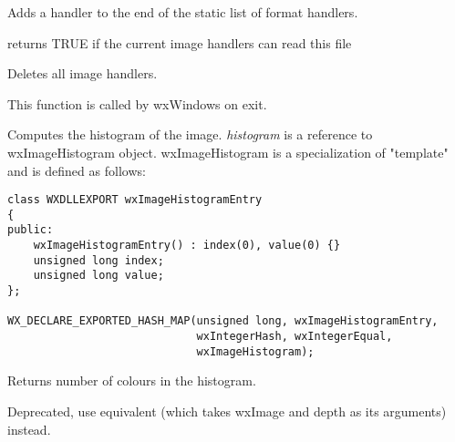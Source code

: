 Adds a handler to the end of the static list of format handlers.





returns TRUE if the current image handlers can read this file



Deletes all image handlers.

This function is called by wxWindows on exit.

\label{wximagecomputehistogram}


Computes the histogram of the image. {\it histogram} is a reference to 
wxImageHistogram object. wxImageHistogram is a specialization of 
 "template" and is defined as follows:

\begin{verbatim}
class WXDLLEXPORT wxImageHistogramEntry
{
public:
    wxImageHistogramEntry() : index(0), value(0) {}
    unsigned long index;
    unsigned long value;
};

WX_DECLARE_EXPORTED_HASH_MAP(unsigned long, wxImageHistogramEntry,
                             wxIntegerHash, wxIntegerEqual,
                             wxImageHistogram);
\end{verbatim}


Returns number of colours in the histogram.

\label{wximageconverttobitmap}


Deprecated, use equivalent 
(which takes wxImage and depth as its arguments) instead.

\label{wxbitmapconverttomono}

